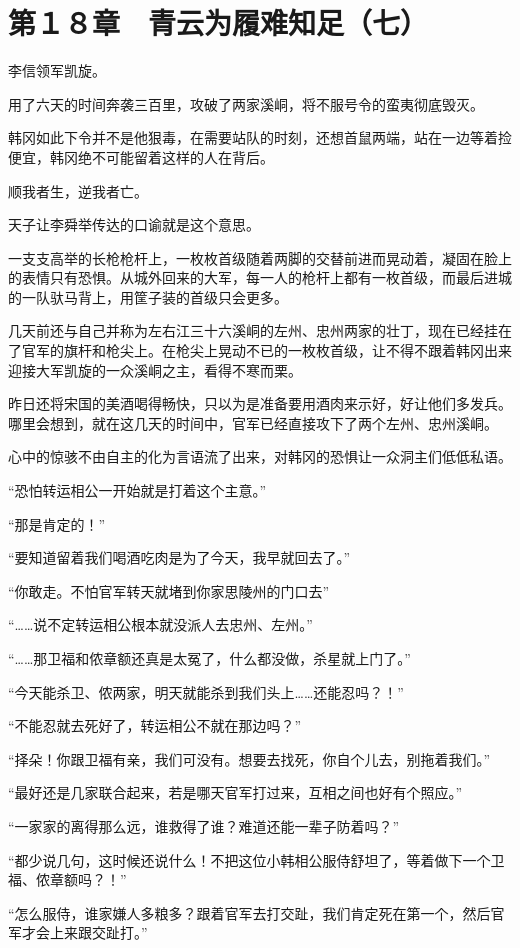 \section{第１８章　青云为履难知足（七）}

李信领军凯旋。

用了六天的时间奔袭三百里，攻破了两家溪峒，将不服号令的蛮夷彻底毁灭。

韩冈如此下令并不是他狠毒，在需要站队的时刻，还想首鼠两端，站在一边等着捡便宜，韩冈绝不可能留着这样的人在背后。

顺我者生，逆我者亡。

天子让李舜举传达的口谕就是这个意思。

一支支高举的长枪枪杆上，一枚枚首级随着两脚的交替前进而晃动着，凝固在脸上的表情只有恐惧。从城外回来的大军，每一人的枪杆上都有一枚首级，而最后进城的一队驮马背上，用筐子装的首级只会更多。

几天前还与自己并称为左右江三十六溪峒的左州、忠州两家的壮丁，现在已经挂在了官军的旗杆和枪尖上。在枪尖上晃动不已的一枚枚首级，让不得不跟着韩冈出来迎接大军凯旋的一众溪峒之主，看得不寒而栗。

昨日还将宋国的美酒喝得畅快，只以为是准备要用酒肉来示好，好让他们多发兵。哪里会想到，就在这几天的时间中，官军已经直接攻下了两个左州、忠州溪峒。

心中的惊骇不由自主的化为言语流了出来，对韩冈的恐惧让一众洞主们低低私语。

“恐怕转运相公一开始就是打着这个主意。”

“那是肯定的！”

“要知道留着我们喝酒吃肉是为了今天，我早就回去了。”

“你敢走。不怕官军转天就堵到你家思陵州的门口去”

“……说不定转运相公根本就没派人去忠州、左州。”

“……那卫福和侬章额还真是太冤了，什么都没做，杀星就上门了。”

“今天能杀卫、侬两家，明天就能杀到我们头上……还能忍吗？！”

“不能忍就去死好了，转运相公不就在那边吗？”

“择朵！你跟卫福有亲，我们可没有。想要去找死，你自个儿去，别拖着我们。”

“最好还是几家联合起来，若是哪天官军打过来，互相之间也好有个照应。”

“一家家的离得那么远，谁救得了谁？难道还能一辈子防着吗？”

“都少说几句，这时候还说什么！不把这位小韩相公服侍舒坦了，等着做下一个卫福、侬章额吗？！”

“怎么服侍，谁家嫌人多粮多？跟着官军去打交趾，我们肯定死在第一个，然后官军才会上来跟交趾打。”

